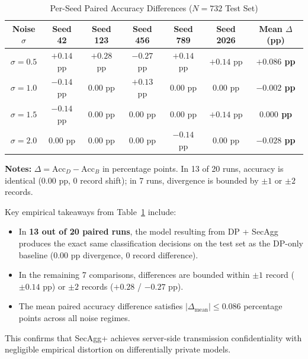 \documentclass[journal,twocolumn,10pt]{IEEEtran}
\begin{document}
\begin{table}[htbp]
\caption{Per-Seed Paired Accuracy Differences ($N = 732$ Test Set)}
\label{tab:paired_differences}
\centering
\scriptsize
\begin{tabular}{ccccccc}
\toprule
\textbf{Noise $\sigma$} & \textbf{Seed 42} & \textbf{Seed 123} & \textbf{Seed 456} & \textbf{Seed 789} & \textbf{Seed 2026} & \textbf{Mean $\Delta$ (pp)} \\
\midrule
$\sigma=0.5$ & $+0.14$ pp & $+0.28$ pp & $-0.27$ pp & $+0.14$ pp & $+0.14$ pp & \textbf{$+0.086$ pp} \\
$\sigma=1.0$ & $-0.14$ pp & $0.00$ pp & $+0.13$ pp & $0.00$ pp & $0.00$ pp & \textbf{$-0.002$ pp} \\
$\sigma=1.5$ & $-0.14$ pp & $0.00$ pp & $0.00$ pp & $0.00$ pp & $+0.14$ pp & \textbf{$0.000$ pp} \\
$\sigma=2.0$ & $0.00$ pp & $0.00$ pp & $0.00$ pp & $-0.14$ pp & $0.00$ pp & \textbf{$-0.028$ pp} \\
\bottomrule
\end{tabular}
\vspace{1mm}
\begin{flushleft}
\scriptsize \textbf{Notes:} $\Delta = \text{Acc}_D - \text{Acc}_B$ in percentage points. In 13 of 20 runs, accuracy is identical ($0.00\text{ pp}$, 0 record shift); in 7 runs, divergence is bounded by $\pm 1$ or $\pm 2$ records.
\end{flushleft}
\end{table}

Key empirical takeaways from Table~\ref{tab:paired_differences} include:
\begin{itemize}
    \item In \textbf{13 out of 20 paired runs}, the model resulting from DP + SecAgg produces the exact same classification decisions on the test set as the DP-only baseline ($0.00$ pp divergence, 0 record difference).
    \item In the remaining 7 comparisons, differences are bounded within $\pm 1$ record ($\pm 0.14$ pp) or $\pm 2$ records ($+0.28$ / $-0.27$ pp).
    \item The mean paired accuracy difference satisfies $|\Delta_{\text{mean}}| \le 0.086$ percentage points across all noise regimes.
\end{itemize}
This confirms that SecAgg+ achieves server-side transmission confidentiality with negligible empirical distortion on differentially private models.
\end{document}
